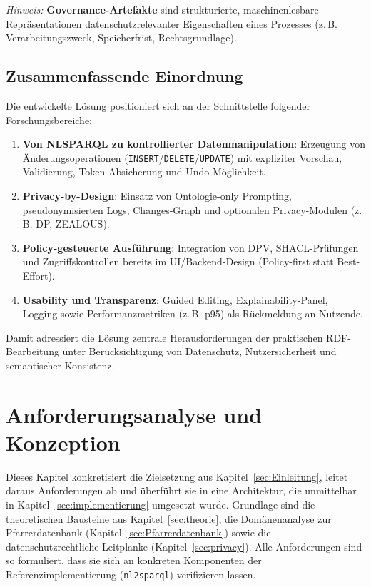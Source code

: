 \textit{Hinweis:} \textbf{Governance-Artefakte} sind strukturierte, maschinenlesbare Repräsentationen datenschutzrelevanter Eigenschaften eines Prozesses (z.\,B. Verarbeitungszweck, Speicherfrist, Rechtsgrundlage).

\section{Zusammenfassende Einordnung}

Die entwickelte Lösung positioniert sich an der Schnittstelle folgender Forschungsbereiche:

\begin{enumerate}
  \item \textbf{Von NL{\textrightarrow}SPARQL zu kontrollierter Datenmanipulation}: Erzeugung von Änderungsoperationen (\texttt{INSERT}/\texttt{DELETE}/\texttt{UPDATE}) mit expliziter Vorschau, Validierung, Token-Absicherung und Undo-Möglichkeit.
  \item \textbf{Privacy-by-Design}: Einsatz von Ontologie-only Prompting, pseudonymisierten Logs, Changes-Graph und optionalen Privacy-Modulen (z.\,B. DP, ZEALOUS).
  \item \textbf{Policy-gesteuerte Ausführung}: Integration von DPV, SHACL-Prüfungen und Zugriffskontrollen bereits im UI/Backend-Design (Policy-first statt Best-Effort).
  \item \textbf{Usability und Transparenz}: Guided Editing, Explainability-Panel, Logging sowie Performanzmetriken (z.\,B. p95) als Rückmeldung an Nutzende.
\end{enumerate}

Damit adressiert die Lösung zentrale Herausforderungen der praktischen RDF-Bearbeitung unter Berücksichtigung von Datenschutz, Nutzersicherheit und semantischer Konsistenz.











\chapter{Anforderungsanalyse und Konzeption}
\label{sec:konzeption}

Dieses Kapitel konkretisiert die Zielsetzung aus Kapitel~\ref{sec:Einleitung}, leitet daraus Anforderungen ab und überführt sie in eine Architektur, die unmittelbar in Kapitel~\ref{sec:implementierung} umgesetzt wurde. Grundlage sind die theoretischen Bausteine aus Kapitel~\ref{sec:theorie}, die Domänenanalyse zur Pfarrerdatenbank (Kapitel~\ref{sec:Pfarrerdatenbank}) sowie die datenschutzrechtliche Leitplanke (Kapitel~\ref{sec:privacy}). Alle Anforderungen sind so formuliert, dass sie sich an konkreten Komponenten der Referenzimplementierung (\texttt{nl2sparql}) verifizieren lassen.


